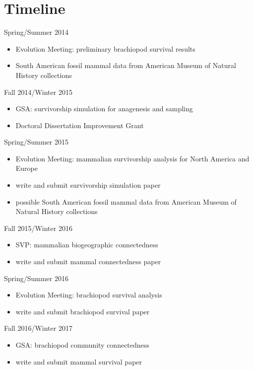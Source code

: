 \documentclass[12pt,letterpaper]{article}
\begin{document}
\clearpage

\section{Timeline}

Spring/Summer 2014
\begin{itemize}
  \item Evolution Meeting: preliminary brachiopod survival results
  \item South American fossil mammal data from American Museum of Natural History collections
\end{itemize}

Fall 2014/Winter 2015
\begin{itemize}
  \item GSA: survivorship simulation for anagenesis and sampling
  \item Doctoral Dissertation Improvement Grant
\end{itemize}

Spring/Summer 2015
\begin{itemize}
  \item Evolution Meeting: mammalian survivorship analysis for North America and Europe
  \item write and submit survivorship simulation paper
  \item possible South American fossil mammal data from American Museum of Natural History collections
\end{itemize}

Fall 2015/Winter 2016
\begin{itemize}
  \item SVP: mammalian biogeographic connectedness
  \item write and submit mammal connectedness paper
\end{itemize}

Spring/Summer 2016
\begin{itemize}
  \item Evolution Meeting: brachiopod survival analysis
  \item write and submit brachiopod survival paper
\end{itemize}

Fall 2016/Winter 2017
\begin{itemize}
  \item GSA: brachiopod community connectedness
  \item write and submit mammal survival paper
\end{itemize}
\end{document}
